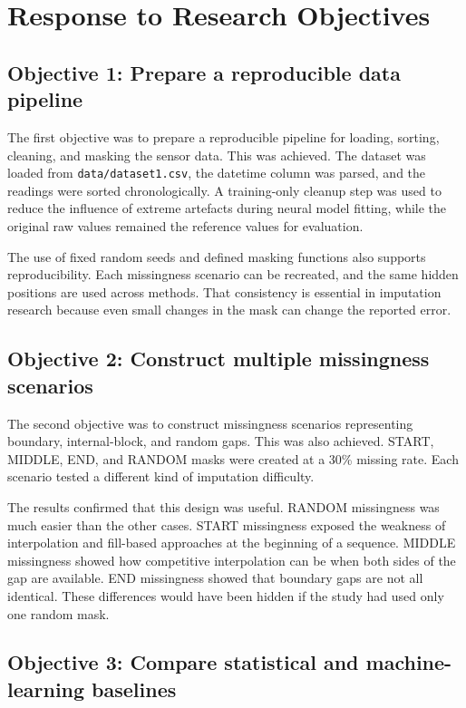 \section{Response to Research Objectives}

\subsection{Objective 1: Prepare a reproducible data pipeline}

The first objective was to prepare a reproducible pipeline for loading, sorting, cleaning, and masking the sensor data. This was achieved. The dataset was loaded from \texttt{data/dataset1.csv}, the datetime column was parsed, and the readings were sorted chronologically. A training-only cleanup step was used to reduce the influence of extreme artefacts during neural model fitting, while the original raw values remained the reference values for evaluation.

The use of fixed random seeds and defined masking functions also supports reproducibility. Each missingness scenario can be recreated, and the same hidden positions are used across methods. That consistency is essential in imputation research because even small changes in the mask can change the reported error.

\subsection{Objective 2: Construct multiple missingness scenarios}

The second objective was to construct missingness scenarios representing boundary, internal-block, and random gaps. This was also achieved. START, MIDDLE, END, and RANDOM masks were created at a 30\% missing rate. Each scenario tested a different kind of imputation difficulty.

The results confirmed that this design was useful. RANDOM missingness was much easier than the other cases. START missingness exposed the weakness of interpolation and fill-based approaches at the beginning of a sequence. MIDDLE missingness showed how competitive interpolation can be when both sides of the gap are available. END missingness showed that boundary gaps are not all identical. These differences would have been hidden if the study had used only one random mask.

\subsection{Objective 3: Compare statistical and machine-learning baselines}

